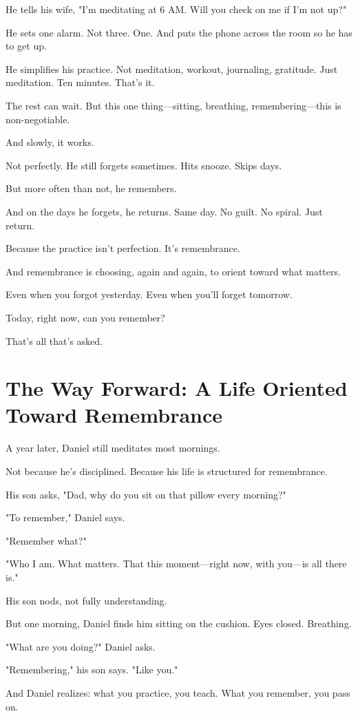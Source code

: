 \documentclass[11pt,twoside]{book}
\begin{document}
He tells his wife, "I'm meditating at 6 AM. Will you check on me if I'm not up?"

He sets one alarm. Not three. One. And puts the phone across the room so he has to get up.

He simplifies his practice. Not meditation, workout, journaling, gratitude. Just meditation. Ten minutes. That's it.

The rest can wait. But this one thing—sitting, breathing, remembering—this is non-negotiable.

And slowly, it works.

Not perfectly. He still forgets sometimes. Hits snooze. Skips days.

But more often than not, he remembers.

And on the days he forgets, he returns. Same day. No guilt. No spiral. Just return.

Because the practice isn't perfection. It's remembrance.

And remembrance is choosing, again and again, to orient toward what matters.

Even when you forgot yesterday. Even when you'll forget tomorrow.

Today, right now, can you remember?

That's all that's asked.

\section*{The Way Forward: A Life Oriented Toward Remembrance}

A year later, Daniel still meditates most mornings.

Not because he's disciplined. Because his life is structured for remembrance.

His son asks, "Dad, why do you sit on that pillow every morning?"

"To remember," Daniel says.

"Remember what?"

"Who I am. What matters. That this moment—right now, with you—is all there is."

His son nods, not fully understanding.

But one morning, Daniel finds him sitting on the cushion. Eyes closed. Breathing.

"What are you doing?" Daniel asks.

"Remembering," his son says. "Like you."

And Daniel realizes: what you practice, you teach. What you remember, you pass on.
\end{document}

